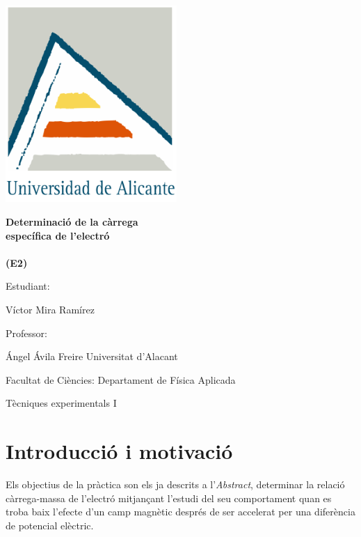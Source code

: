 \documentclass[11pt]{article}
\newcommand{\titulo}{Determinació de la càrrega\\específica de l'electró\\\ \\(E2)}
\newcommand{\nombreestudiante}{Víctor Mira Ramírez}
\newcommand{\nombredirector}{Ángel Ávila Freire}
\newcommand{\fecha}{\date{Març 2023}}  %
\begin{document}
\begin{titlepage}
	\centering
	\includegraphics[width=65mm]{fotos/logoUA.png}\par
	\vspace{1cm}
	{\huge\bfseries \vspace{15mm} \titulo \par}
	\vfill
	{\large 
	\vfill
	Estudiant:\par\vspace{2mm}
	\nombreestudiante\par
	\vfill
	Professor:\par\vspace{2mm}
    \nombredirector
    \vfill
    Universitat d'Alacant\par
    Facultat de Ciències: Departament de Física Aplicada\par
    Tècniques experimentals I\par
	\fecha\par}
\end{titlepage}

\pagebreak

\begin{abstract}\label{sec:abstract}
    \noindent L'objectiu de la pràctica es descriure la interacció d'electrons accelerats per camps elèctrics i que es troben sota l'acció de camps magnètics. També determinarem la relació càrrega/massa de l'electró gràcies a l'anàlisi anterior.
\end{abstract}

\vspace{0.3cm}
\tableofcontents
\newpage

\section{Introducció i motivació}
    Els objectius de la pràctica son els ja descrits a l'\textit{Abstract}, determinar la relació càrrega-massa de l'electró mitjançant l'estudi del seu comportament quan es troba baix l'efecte d'un camp magnètic després de ser accelerat per una diferència de potencial elèctric. 
\end{document}
